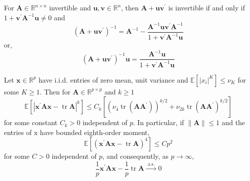 \begin{lemma} \label{lem:sherman-morrison}
	For $\mathbf{A}\in\mathbb{R}^{n\times n}$ invertible and $\mathbf{u},\mathbf{v}\in\mathbb{R}^{n}$, then $\mathbf{A}+\mathbf{u}\mathbf{v}^{\prime}$ is invertible if and only if $1+\mathbf{v}^{\prime}\mathbf{A}^{-1}\mathbf{u}\neq 0$ and
	\begin{equation}
		\left(\mathbf{A}+\mathbf{u}\mathbf{v}^{\prime}\right)^{-1}=\mathbf{A}^{-1}-\frac{\mathbf{A}^{-1}\mathbf{u}\mathbf{v}^{\prime}\mathbf{A}^{-1}}{1+\mathbf{v}^{\prime}\mathbf{A}^{-1}\mathbf{u}}
	\end{equation}
	or,
	\begin{equation}
		\left(\mathbf{A}+\mathbf{u}\mathbf{v}^{\prime}\right)^{-1}\mathbf{u}=\frac{\mathbf{A}^{-1}\mathbf{u}}{1+\mathbf{v}^{\prime}\mathbf{A}^{-1}\mathbf{u}}
	\end{equation}
\end{lemma}

\begin{lemma} \label{lem:quadratic-form-close-to-the-trace}
	Let $\mathbf{x} \in \mathbb{R}^{p}$ have i.i.d. entries of zero mean, unit variance and $\mathbb{E}\left[\left|x_{i}\right|^{K}\right] \leq \nu_{K}$ for some $K \geq 1 .$ Then for $\mathbf{A} \in \mathbb{R}^{p \times p}$ and $k \geq 1$
	$$
		\mathbb{E}\left[\left|\mathbf{x}^{\prime} \mathbf{A} \mathbf{x}-\operatorname{tr} \mathbf{A}\right|^{k}\right] \leq C_{k}\left[\left(\nu_{4} \operatorname{tr}\left(\mathbf{A} \mathbf{A}^{\prime}\right)\right)^{k / 2}+\nu_{2 k} \operatorname{tr}\left(\mathbf{A} \mathbf{A}^{\prime}\right)^{k / 2}\right]
	$$
	for some constant $C_{k}>0$ independent of $p .$ In particular, if $\|\mathbf{A}\| \leq 1$ and the entries of $\mathrm{x}$ have bounded eighth-order moment,
	$$
		\mathbb{E}\left[\left(\mathbf{x}^{\prime} \mathbf{A} \mathbf{x}-\operatorname{tr} \mathbf{A}\right)^{4}\right] \leq C p^{2}
	$$
	for some $C>0$ independent of $p$, and consequently, as $p \rightarrow \infty$,
	$$
		\frac{1}{p} \mathbf{x}^{\prime} \mathbf{A} \mathbf{x}-\frac{1}{p} \operatorname{tr} \mathbf{A} \stackrel{\text { a.s. }}{\longrightarrow} 0
	$$
\end{lemma}
